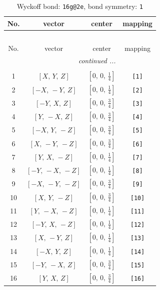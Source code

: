\documentclass[fleqn,8pt]{jsarticle}
\begin{document}
\begin{longtable}{cccc}
\caption{Wyckoff bond: {\tt 16g@2e}, bond symmetry: {\tt 1}}
 \\
 \hline \hline
No. & vector & center & mapping \\ \hline \endfirsthead

\multicolumn{3}{l}{\tablename\ \thetable{}} \\
 \hline \hline
No. & vector & center & mapping \\ \hline \endhead

 \hline \hline
\multicolumn{3}{r}{\footnotesize\it continued ...} \\ \endfoot

 \hline \hline
\multicolumn{3}{r}{} \\ \endlastfoot

1 & $\left[ X,\, Y,\, Z \right]$ & $\left[ 0,\, 0,\, \frac{1}{4} \right]$ & {\tt [1]} \\ \hline
2 & $\left[ - X,\, - Y,\, Z \right]$ & $\left[ 0,\, 0,\, \frac{1}{4} \right]$ & {\tt [2]} \\ \hline
3 & $\left[ - Y,\, X,\, Z \right]$ & $\left[ 0,\, 0,\, \frac{3}{4} \right]$ & {\tt [3]} \\ \hline
4 & $\left[ Y,\, - X,\, Z \right]$ & $\left[ 0,\, 0,\, \frac{3}{4} \right]$ & {\tt [4]} \\ \hline
5 & $\left[ - X,\, Y,\, - Z \right]$ & $\left[ 0,\, 0,\, \frac{3}{4} \right]$ & {\tt [5]} \\ \hline
6 & $\left[ X,\, - Y,\, - Z \right]$ & $\left[ 0,\, 0,\, \frac{3}{4} \right]$ & {\tt [6]} \\ \hline
7 & $\left[ Y,\, X,\, - Z \right]$ & $\left[ 0,\, 0,\, \frac{1}{4} \right]$ & {\tt [7]} \\ \hline
8 & $\left[ - Y,\, - X,\, - Z \right]$ & $\left[ 0,\, 0,\, \frac{1}{4} \right]$ & {\tt [8]} \\ \hline
9 & $\left[ - X,\, - Y,\, - Z \right]$ & $\left[ 0,\, 0,\, \frac{3}{4} \right]$ & {\tt [9]} \\ \hline
10 & $\left[ X,\, Y,\, - Z \right]$ & $\left[ 0,\, 0,\, \frac{3}{4} \right]$ & {\tt [10]} \\ \hline
11 & $\left[ Y,\, - X,\, - Z \right]$ & $\left[ 0,\, 0,\, \frac{1}{4} \right]$ & {\tt [11]} \\ \hline
12 & $\left[ - Y,\, X,\, - Z \right]$ & $\left[ 0,\, 0,\, \frac{1}{4} \right]$ & {\tt [12]} \\ \hline
13 & $\left[ X,\, - Y,\, Z \right]$ & $\left[ 0,\, 0,\, \frac{1}{4} \right]$ & {\tt [13]} \\ \hline
14 & $\left[ - X,\, Y,\, Z \right]$ & $\left[ 0,\, 0,\, \frac{1}{4} \right]$ & {\tt [14]} \\ \hline
15 & $\left[ - Y,\, - X,\, Z \right]$ & $\left[ 0,\, 0,\, \frac{3}{4} \right]$ & {\tt [15]} \\ \hline
16 & $\left[ Y,\, X,\, Z \right]$ & $\left[ 0,\, 0,\, \frac{3}{4} \right]$ & {\tt [16]} \\
\end{longtable}
\end{document}
